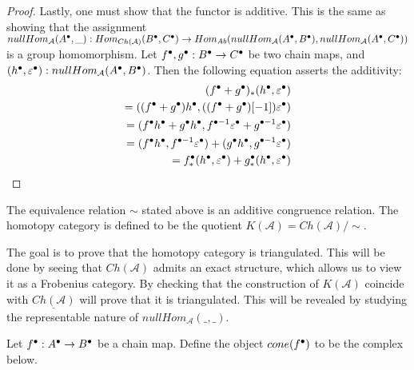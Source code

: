 \begin{proof}
        Lastly, one must show that the functor is additive. This is the same as showing that the assignment \\ $nullHom_{\mathcal{A}}(A^{\bullet},\_):Hom_{Ch(\mathcal{A})}(B^{\bullet},C^{\bullet})\rightarrow Hom_{Ab}(nullHom_{\mathcal{A}}(A^{\bullet},B^{\bullet}),nullHom_{\mathcal{A}}(A^{\bullet},C^{\bullet}))$ is a group homomorphism. Let $f^{\bullet},g^{\bullet}:B^{\bullet}\rightarrow C^{\bullet}$ be two chain maps, and $(h^{\bullet},\varepsilon^{\bullet}):nullHom_{\mathcal{A}}(A^{\bullet},B^{\bullet})$. Then the following equation asserts the additivity:
        \begin{align*}
            (f^{\bullet}+g^{\bullet})_*(h^{\bullet},\varepsilon^{\bullet})\\
            =((f^{\bullet}+g^{\bullet})h^{\bullet},((f^{\bullet}+g^{\bullet})[-1])\varepsilon^{\bullet})\\
            =(f^{\bullet}h^{\bullet}+g^{\bullet}h^{\bullet},f^{\bullet-1}\varepsilon^{\bullet}+g^{\bullet-1}\varepsilon^{\bullet})\\
            =(f^{\bullet}h^{\bullet},f^{\bullet-1}\varepsilon^{\bullet})+(g^{\bullet}h^{\bullet},g^{\bullet-1}\varepsilon^{\bullet})\\
            =f^{\bullet}_*(h^{\bullet},\varepsilon^{\bullet})+g^{\bullet}_*(h^{\bullet},\varepsilon^{\bullet})
        \end{align*}
    \end{proof}

    \begin{corollary}
        The equivalence relation $\sim$ stated above is an additive congruence relation. The homotopy category is defined to be the quotient $K(\mathcal{A}) = Ch(\mathcal{A})/\sim$.
    \end{corollary}

    The goal is to prove that the homotopy category is triangulated. This will be done by seeing that $Ch(\mathcal{A})$ admits an exact structure, which allows us to view it as a Frobenius category. By checking that the construction of $K(\mathcal{A})$ coincide with $\underline{Ch(\mathcal{A})}$ will prove that it is triangulated. This will be revealed by studying the representable nature of $nullHom_{\mathcal{A}}(\_,\_)$.

    \begin{definition}
        Let $f^{\bullet}:A^{\bullet}\rightarrow B^{\bullet}$ be a chain map. Define the object $cone(f^{\bullet})$ to be the complex below.
        \begin{center}
        \end{center}
    \end{definition}

